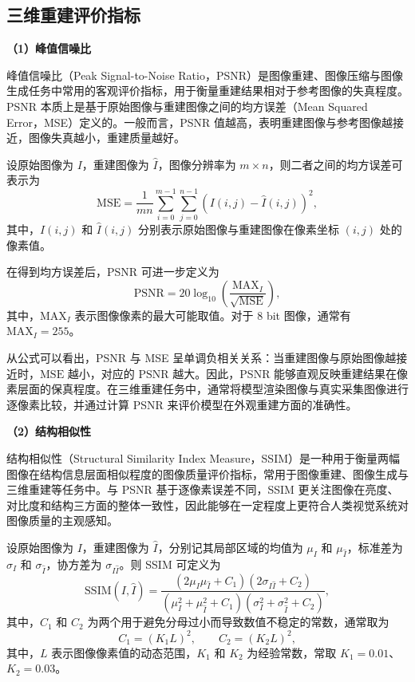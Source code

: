 \subsection{三维重建评价指标}
\noindent\textbf{（1）峰值信噪比}

峰值信噪比（Peak Signal-to-Noise Ratio\cite{huynhthu2008psnr}，PSNR）是图像重建、图像压缩与图像生成任务中常用的客观评价指标，用于衡量重建结果相对于参考图像的失真程度。PSNR 本质上是基于原始图像与重建图像之间的均方误差（Mean Squared Error，MSE）定义的。一般而言，PSNR 值越高，表明重建图像与参考图像越接近，图像失真越小，重建质量越好。

设原始图像为 $I$，重建图像为 $\hat{I}$，图像分辨率为 $m \times n$，则二者之间的均方误差可表示为
\begin{equation}
\mathrm{MSE} = \frac{1}{mn} \sum_{i=0}^{m-1} \sum_{j=0}^{n-1} \left( I(i,j) - \hat{I}(i,j) \right)^2 ,
\label{eq:psnr_mse}
\end{equation}
其中，$I(i,j)$ 和 $\hat{I}(i,j)$ 分别表示原始图像与重建图像在像素坐标 $(i,j)$ 处的像素值。

在得到均方误差后，PSNR 可进一步定义为
\begin{equation}
\mathrm{PSNR} = 20 \log_{10}\left( \frac{\mathrm{MAX}_I}{\sqrt{\mathrm{MSE}}} \right) ,
\label{eq:psnr}
\end{equation}
其中，$\mathrm{MAX}_I$ 表示图像像素的最大可能取值。对于 8 bit 图像，通常有 $\mathrm{MAX}_I = 255$。

从公式可以看出，PSNR 与 MSE 呈单调负相关关系：当重建图像与原始图像越接近时，$\mathrm{MSE}$ 越小，对应的 $\mathrm{PSNR}$ 越大。因此，PSNR 能够直观反映重建结果在像素层面的保真程度。在三维重建任务中，通常将模型渲染图像与真实采集图像进行逐像素比较，并通过计算 PSNR 来评价模型在外观重建方面的准确性。

\noindent\textbf{（2）结构相似性}

结构相似性（Structural Similarity Index Measure\cite{wang2004ssim}，SSIM）是一种用于衡量两幅图像在结构信息层面相似程度的图像质量评价指标，常用于图像重建、图像生成与三维重建等任务中。与 PSNR 基于逐像素误差不同，SSIM 更关注图像在亮度、对比度和结构三方面的整体一致性，因此能够在一定程度上更符合人类视觉系统对图像质量的主观感知。

设原始图像为 $I$，重建图像为 $\hat{I}$，分别记其局部区域的均值为 $\mu_I$ 和 $\mu_{\hat{I}}$，标准差为 $\sigma_I$ 和 $\sigma_{\hat{I}}$，协方差为 $\sigma_{I\hat{I}}$。则 SSIM 可定义为
\begin{equation}
\mathrm{SSIM}(I,\hat{I}) =
\frac{(2\mu_I\mu_{\hat{I}} + C_1)(2\sigma_{I\hat{I}} + C_2)}
{(\mu_I^2 + \mu_{\hat{I}}^2 + C_1)(\sigma_I^2 + \sigma_{\hat{I}}^2 + C_2)} ,
\label{eq:ssim}
\end{equation}
其中，$C_1$ 和 $C_2$ 为两个用于避免分母过小而导致数值不稳定的常数，通常取为
\begin{equation}
C_1 = (K_1 L)^2,\qquad C_2 = (K_2 L)^2,
\label{eq:ssim_constants}
\end{equation}
其中，$L$ 表示图像像素值的动态范围，$K_1$ 和 $K_2$ 为经验常数，常取 $K_1=0.01$、$K_2=0.03$。

